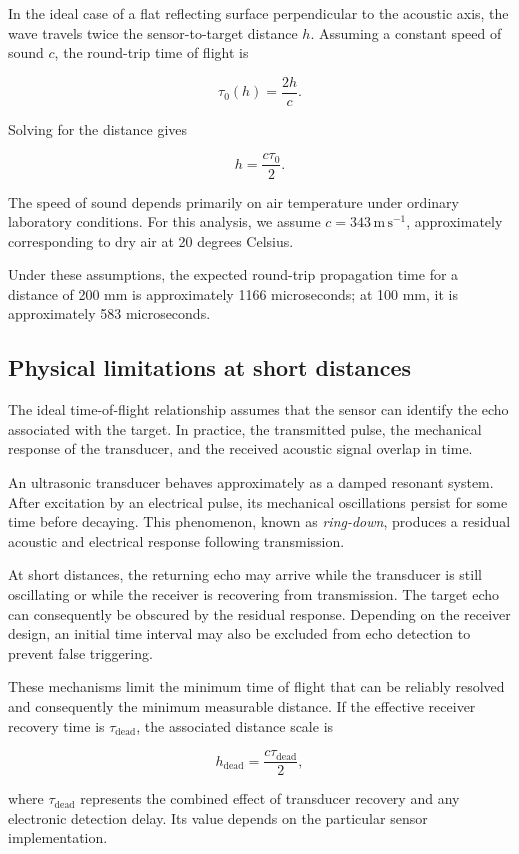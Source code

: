 \documentclass[11pt,a4paper]{article}
\begin{document}
In the ideal case of a flat reflecting surface perpendicular to the acoustic axis, the wave travels twice the sensor-to-target distance \(h\). Assuming a constant speed of sound \(c\), the round-trip time of flight is

\[
\tau_0(h)=\frac{2h}{c}.
\]

Solving for the distance gives

\[
h=\frac{c\tau_0}{2}.
\]

The speed of sound depends primarily on air temperature under ordinary laboratory conditions. For this analysis, we assume \(c=343\,\mathrm{m\,s^{-1}}\), approximately corresponding to dry air at 20 degrees Celsius.

Under these assumptions, the expected round-trip propagation time for a distance of 200 mm is approximately 1166 microseconds; at 100 mm, it is approximately 583 microseconds.
\subsection{Physical limitations at short distances}
\label{sec:orgeeeb277}
The ideal time-of-flight relationship assumes that the sensor can identify the echo associated with the target. In practice, the transmitted pulse, the mechanical response of the transducer, and the received acoustic signal overlap in time.

An ultrasonic transducer behaves approximately as a damped resonant system. After excitation by an electrical pulse, its mechanical oscillations persist for some time before decaying. This phenomenon, known as \emph{ring-down}, produces a residual acoustic and electrical response following transmission.

At short distances, the returning echo may arrive while the transducer is still oscillating or while the receiver is recovering from transmission. The target echo can consequently be obscured by the residual response. Depending on the receiver design, an initial time interval may also be excluded from echo detection to prevent false triggering.

These mechanisms limit the minimum time of flight that can be reliably resolved and consequently the minimum measurable distance. If the effective receiver recovery time is \(\tau_{\mathrm{dead}}\), the associated distance scale is

\[
h_{\mathrm{dead}}=\frac{c\tau_{\mathrm{dead}}}{2},
\]

where \(\tau_{\mathrm{dead}}\) represents the combined effect of
transducer recovery and any electronic detection delay. Its value
depends on the particular sensor implementation.
\end{document}
